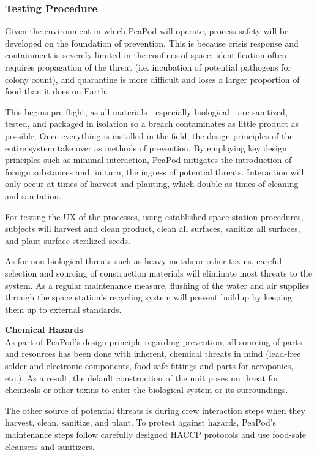 \subsubsection{Testing Procedure}

Given the environment in which PeaPod will operate, process safety will be developed on the foundation of prevention. This is because crisis response and containment is severely limited in the confines of space: identification often requires propagation of the threat (i.e. incubation of potential pathogens for colony count), and quarantine is more difficult and loses a larger proportion of food than it does on Earth.

This begins pre-flight, as all materials - especially biological - are sanitized, tested, and packaged in isolation so a breach contaminates as little product as possible. Once everything is installed in the field, the design principles of the entire system take over as methods of prevention. By employing key design principles such as minimal interaction, PeaPod mitigates the introduction of foreign substances and, in turn, the ingress of potential threats. Interaction will only occur at times of harvest and planting, which double as times of cleaning and sanitation. 

For testing the UX of the processes, using established space station procedures, subjects will harvest and clean product, clean all surfaces, sanitize all surfaces, and plant surface-sterilized seeds.

As for non-biological threats such as heavy metals or other toxins, careful selection and sourcing of construction materials will eliminate most threats to the system. As a regular maintenance measure, flushing of the water and air supplies through the space station's recycling system will prevent buildup by keeping them up to external standards.

\textbf{Chemical Hazards}\\
As part of PeaPod's design principle regarding prevention, all sourcing of parts and resources has been done with inherent, chemical threats in mind (lead-free solder and electronic components, food-safe fittings and parts for aeroponics, etc.). As a result, the default construction of the unit poses no threat for chemicals or other toxins to enter the biological system or its surroundings.

The other source of potential threats is during crew interaction steps when they harvest, clean, sanitize, and plant. To protect against hazards, PeaPod's maintenance steps follow carefully designed HACCP protocols and use food-safe cleansers and sanitizers.

